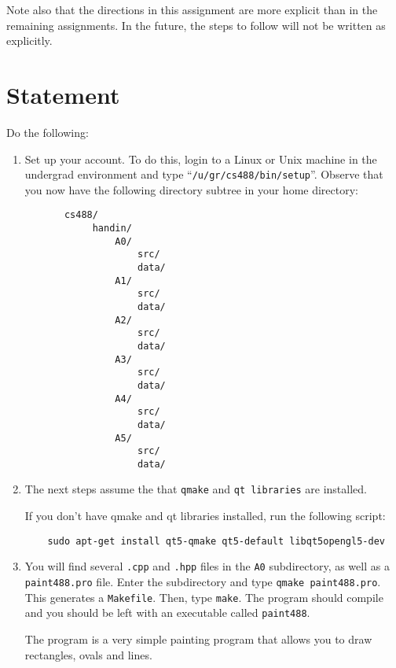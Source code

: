 Note also that the directions in this assignment are more explicit than
in the remaining assignments.  In the future, the steps to follow will
not be written as explicitly.

\section{Statement}
Do the following:
\begin{enumerate}
    \item
        Set up your account.  To do this, login to a Linux or Unix
        machine in the undergrad environment
        and type ``\texttt{/u/gr/cs488/bin/setup}''.
        Observe that you now have
        the following directory subtree in your home directory:
        \begin{verbatim}
       cs488/
            handin/
                A0/
                    src/
                    data/
                A1/
                    src/
                    data/
                A2/
                    src/
                    data/
                A3/
                    src/
                    data/
                A4/
                    src/
                    data/
                A5/
                    src/
                    data/
        \end{verbatim}
        \item 
            The next steps assume the that \texttt{qmake} and \texttt{qt
            libraries} are installed.

            If you don't have qmake and qt libraries installed, run the following
            script:
            \begin{verbatim}
    sudo apt-get install qt5-qmake qt5-default libqt5opengl5-dev
            \end{verbatim} 
        \item
                You will find several \texttt{.cpp} and \texttt{.hpp}
                files in the \texttt{A0} subdirectory, as well as a
                \texttt{paint488.pro} file. Enter the subdirectory and type 
                \texttt{qmake paint488.pro}. This generates a 
                \texttt{Makefile}. Then, type \texttt{make}. The program 
                should compile and you should be left with an executable called
                \texttt{paint488}.

                The program is a very simple painting program that
                allows you to draw rectangles, ovals and lines.


\end{enumerate}
